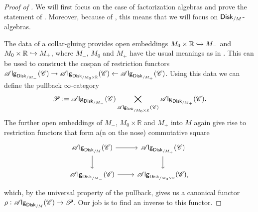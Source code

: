 \documentclass[../text]{subfiles}
\begin{document}
\begin{proof}[Proof of ]
    We will first focus on the case of factorization algebras and prove the statement of . Moreover, because of , this means that we will focus on $\disk[r]_{/M}$-algebras.
    
    The data of a collar-gluing provides open embeddings $M_0 \times \mathbb{R} \xhookrightarrow{} M_-$ and $M_0 \times \mathbb{R} \xhookrightarrow{} M_+$, where $M_-$, $M_0$ and $M_+$ have the usual meanings as in . This can be used to construct the cospan of restriction functors $\alg{\disk[r]_{/M_-}} (\catC) \rightarrow \alg{\disk[r]_{/M_0 \times \mathbb{R}}} (\catC) \leftarrow \alg{\disk[r]_{/M_+}} (\catC)$. Using this data we can define the pullback $\infty$-category
    \begin{equation}
        \mathscr{P} := \alg{\disk[r]_{/M_-}} (\catC) \bigtimes_{\alg{\disk[r]_{/M_0 \times \mathbb{R}}} (\catC)} \alg{\disk[r]_{/M_+}} (\catC).
    \end{equation}
    The further open embeddings of $M_-$, $M_0 \times \mathbb{R}$ and $M_+$ into $M$ again give rise to restriction functors that form a(n on the nose) commutative square
    \begin{equation}
        \begin{tikzcd}
            \alg{\disk[r]_{/M}} (\catC) \arrow[r] \arrow[d] & \alg{\disk[r]_{/M_+}} (\catC) \arrow[d] \\
            \alg{\disk[r]_{/M_-}} (\catC) \arrow[r] & \alg{\disk[r]_{/M_0 \times \mathbb{R}}} (\catC),
        \end{tikzcd}
    \end{equation}
    which, by the universal property of the pullback, gives us a canonical functor $\rho: \alg{\disk[r]_{/M}} (\catC) \rightarrow \mathscr{P}$. Our job is to find an inverse to this functor.
    

\end{proof}
\end{document}
